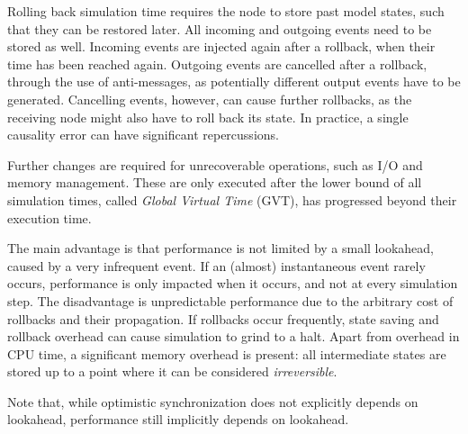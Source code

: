 Rolling back simulation time requires the node to store past model states, such that they can be restored later.
All incoming and outgoing events need to be stored as well.
Incoming events are injected again after a rollback, when their time has been reached again.
Outgoing events are cancelled after a rollback, through the use of anti-messages, as potentially different output events have to be generated.
Cancelling events, however, can cause further rollbacks, as the receiving node might also have to roll back its state.
In practice, a single causality error can have significant repercussions.

Further changes are required for unrecoverable operations, such as I/O and memory management.
These are only executed after the lower bound of all simulation times, called \textit{Global Virtual Time} (GVT), has progressed beyond their execution time.

The main advantage is that performance is not limited by a small lookahead, caused by a very infrequent event.
If an (almost) instantaneous event rarely occurs, performance is only impacted when it occurs, and not at every simulation step.
The disadvantage is unpredictable performance due to the arbitrary cost of rollbacks and their propagation.
If rollbacks occur frequently, state saving and rollback overhead can cause simulation to grind to a halt.
Apart from overhead in CPU time, a significant memory overhead is present: all intermediate states are stored up to a point where it can be considered \textit{irreversible}.

Note that, while optimistic synchronization does not explicitly depends on lookahead, performance still implicitly depends on lookahead.
